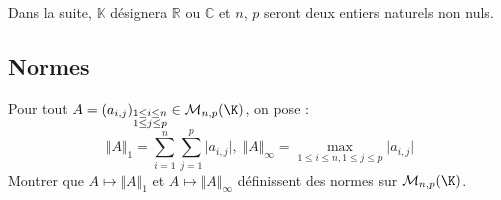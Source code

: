 \documentclass[a4paper,twoside,french,11pt]{VcCours}
\begin{document}

\tableofcontents
\separationTitre



Dans la suite, $\mathbb{K}$ désignera $\mathbb{R}$ ou $\mathbb{C}$ et $n$, $p$ seront deux entiers naturels non nuls.


\subsection{Normes}




\begin{Exercice}{} Pour tout $A = (a_{i,j})_{\substack{1 \leq i \leq n \\ 1 \leq j \leq p}} \in \mathcal{M}_{n,p}(\K)$, on pose :
$$\Vert A \Vert_{1}  = \sum_{i = 1}^{n} \sum_{j = 1}^{p} \vert a_{i,j} \vert, \; \Vert A \Vert_{\infty}  = \max_{1 \leq i \leq n,1 \leq j \leq p} \vert a_{i,j} \vert $$
Montrer que $A \mapsto \Vert A \Vert_{1}$ et $A \mapsto \Vert A \Vert_{\infty}$ définissent des normes sur $\mathcal{M}_{n,p}(\K)$.
\end{Exercice}
\end{document}
